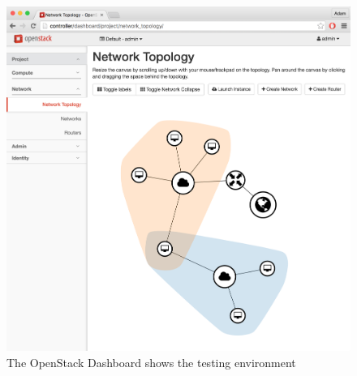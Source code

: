 \begin{figure}[!h]
  \includegraphics[width=\textwidth]{fig/screenshot.png}
  \caption{The OpenStack Dashboard shows the testing environment}
  \label{fig:screenshot}
\end{figure}

